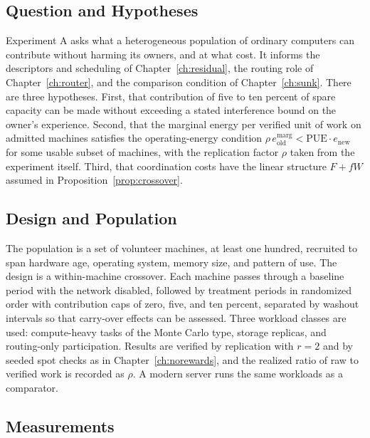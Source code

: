 \subsection*{Question and Hypotheses}

Experiment A asks what a heterogeneous population of ordinary computers can contribute without harming its owners, and at what cost. It informs the descriptors and scheduling of Chapter~\ref{ch:residual}, the routing role of Chapter~\ref{ch:router}, and the comparison condition of Chapter~\ref{ch:sunk}. There are three hypotheses. First, that contribution of five to ten percent of spare capacity can be made without exceeding a stated interference bound on the owner's experience. Second, that the marginal energy per verified unit of work on admitted machines satisfies the operating-energy condition $\rho\,e^{\mathrm{marg}}_{\mathrm{old}}<\mathrm{PUE}\cdot e_{\mathrm{new}}$ for some usable subset of machines, with the replication factor $\rho$ taken from the experiment itself. Third, that coordination costs have the linear structure $F+fW$ assumed in Proposition~\ref{prop:crossover}.

\subsection*{Design and Population}

The population is a set of volunteer machines, at least one hundred, recruited to span hardware age, operating system, memory size, and pattern of use. The design is a within-machine crossover. Each machine passes through a baseline period with the network disabled, followed by treatment periods in randomized order with contribution caps of zero, five, and ten percent, separated by washout intervals so that carry-over effects can be assessed. Three workload classes are used: compute-heavy tasks of the Monte Carlo type, storage replicas, and routing-only participation. Results are verified by replication with $r=2$ and by seeded spot checks as in Chapter~\ref{ch:norewards}, and the realized ratio of raw to verified work is recorded as $\rho$. A modern server runs the same workloads as a comparator.

\subsection*{Measurements}

